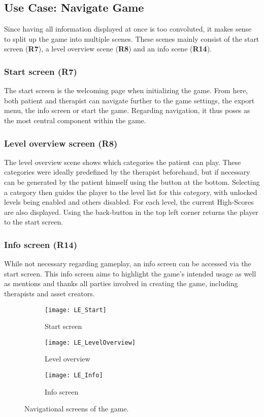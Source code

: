 \documentclass[draft,final]{vutinfth} %
\begin{document}
\subsection{Use Case: Navigate Game} 
Since having all information displayed at once is too convoluted, it makes sense to split up the game into multiple scenes. These scenes mainly consist of the start screen (\textbf{R7}), a level overview scene (\textbf{R8}) and an info scene (\textbf{R14}).

\subsubsection{Start screen (R7)}
The start screen is the welcoming page when initializing the game. From here, both patient and therapist can navigate further to the game settings, the export menu, the info screen or start the game. Regarding navigation, it thus poses as the most central component within the game.

\subsubsection{Level overview screen (R8)}
The level overview scene shows which categories the patient can play. These categories were ideally predefined by the therapist beforehand, but if necessary can be generated by the patient himself using the button at the bottom. Selecting a category then guides the player to the level list for this category, with unlocked levels being enabled and others disabled. For each level, the current High-Scores are also displayed. Using the back-button in the top left corner returns the player to the start screen.

\subsubsection{Info screen (R14)}
While not necessary regarding gameplay, an info screen can be accessed via the start screen. This info screen aims to highlight the game's intended usage as well as mentions and thanks all parties involved in creating the game, including therapists and asset creators.

\begin{figure}
\begin{center}
\begin{subfigure}{.9\textwidth}
  \centering
  \texttt{[image: LE\_Start]}
  \caption{Start screen}
\end{subfigure}
\begin{subfigure}{.9\textwidth}
  \centering
  \texttt{[image: LE\_LevelOverview]}
  \caption{Level overview}
\end{subfigure}
\begin{subfigure}{.9\textwidth}
  \centering
  \texttt{[image: LE\_Info]}
  \caption{Info screen}
\end{subfigure}
\caption{Navigational screens of the game.}
\end{center}
\end{figure}
\end{document}
